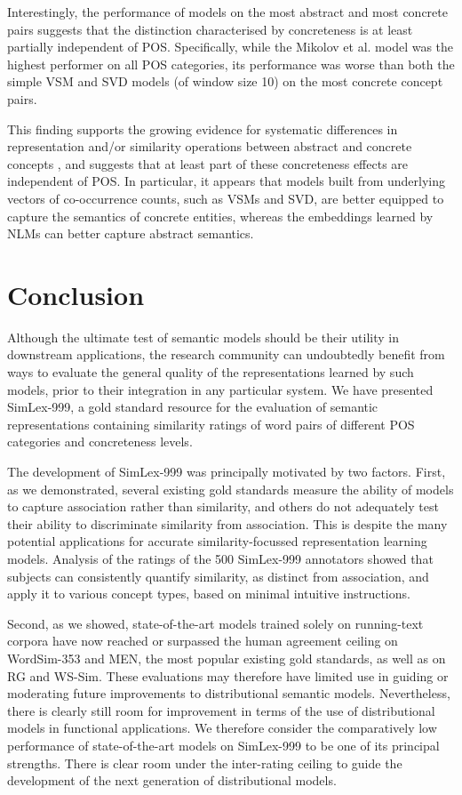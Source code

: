 \documentclass[fullname]{clv2}
\begin{document}
Interestingly, the performance of models on the most abstract and most concrete pairs suggests that the distinction characterised by concreteness is at least partially independent of POS. Specifically, while the Mikolov et al. model was the highest performer on all POS categories, its performance was worse than both the simple VSM and SVD models (of window size 10) on the most concrete concept pairs.

This finding supports the growing evidence for systematic differences in representation and/or similarity operations between abstract and concrete concepts \cite{hill2013concreteness}, and suggests that at least part of these concreteness effects are independent of POS. In particular, it appears that models built from underlying vectors of co-occurrence counts, such as VSMs and SVD, are better equipped to capture the semantics of concrete entities, whereas the embeddings learned by NLMs can better capture abstract semantics. 

\section{Conclusion} 

Although the ultimate test of semantic models should be their utility in downstream applications, the research community can undoubtedly benefit from ways to evaluate the general quality of the representations learned by such models, prior to their integration in any particular system. We have presented SimLex-999, a gold standard resource for the evaluation of semantic representations containing similarity ratings of word pairs of different POS categories and concreteness levels. 

The development of SimLex-999 was principally motivated by two factors. First, as we demonstrated, several existing gold standards measure the ability of models to capture association rather than similarity, and others do not adequately test their ability to discriminate similarity from association. This is despite the many potential applications for accurate similarity-focussed representation learning models. Analysis of the ratings of the 500 SimLex-999 annotators showed that subjects can consistently quantify similarity, as distinct from association, and apply it to various concept types, based on minimal intuitive instructions. 

Second, as we showed, state-of-the-art models trained solely on running-text corpora have now reached or surpassed the human agreement ceiling on WordSim-353 and MEN, the most popular existing gold standards, as well as on RG and WS-Sim. These evaluations may therefore have limited use in guiding or moderating future improvements to distributional semantic models. Nevertheless, there is clearly still room for improvement in terms of the use of distributional models in functional applications. We therefore consider the comparatively low performance of state-of-the-art models on SimLex-999 to be one of its principal strengths. There is clear room under the inter-rating ceiling to guide the development of the next generation of distributional models. 
\end{document}

